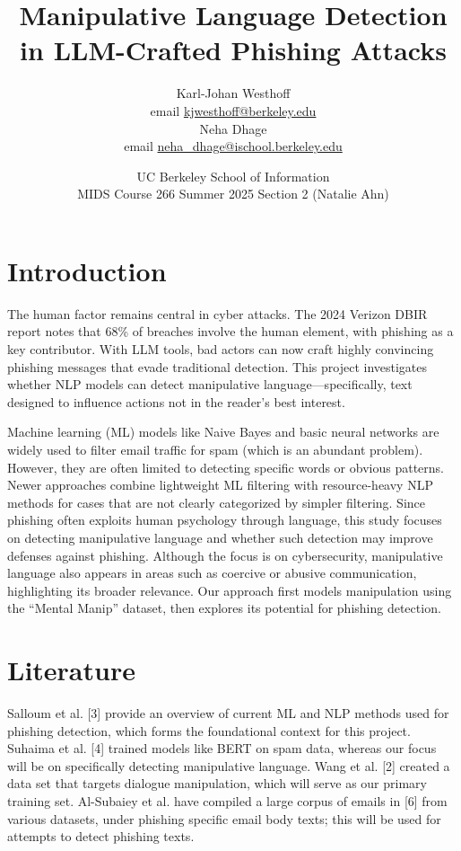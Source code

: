 \documentclass[
	letterpaper, %
	12pt, %
	unnumberedsections, %
	twoside, %
]{LTJournalArticle}
\title{Manipulative Language Detection in LLM-Crafted
Phishing Attacks
}  %
\author{
	Karl-Johan Westhoff \\
	email \href{mailto:kjwesthoff@berkeley.edu}{kjwesthoff@berkeley.edu} \\
    Neha Dhage \\
	email \href{mailto:neha_dhage@ischool.berkeley.edu}{neha_dhage@ischool.berkeley.edu}
}
\date{UC Berkeley School of Information \\
MIDS Course 266 Summer 2025 Section 2 (Natalie Ahn) \\
}
\begin{document}
\maketitle %
\section{Introduction}
The human factor remains central in cyber attacks. The 2024 Verizon DBIR report  notes that 68\% of breaches involve the human element, with phishing as a key contributor. With LLM tools, bad actors can now craft highly convincing phishing messages that evade traditional detection.
This project investigates whether NLP models can detect manipulative language—specifically, text designed to influence actions not in the reader's best interest.

Machine learning (ML) models like Naive Bayes and basic neural networks are widely used to filter email traffic for spam (which is an abundant problem). However, they are often limited to detecting specific words or obvious patterns. Newer approaches combine lightweight ML filtering with resource-heavy NLP methods for cases that are not clearly categorized by simpler filtering. Since phishing often exploits human psychology through language, this study focuses on detecting manipulative language and whether such detection may improve defenses against phishing. Although the focus is on cybersecurity, manipulative language also appears in areas such as coercive or abusive communication, highlighting its broader relevance. Our approach first models manipulation using the “Mental Manip” dataset, then explores its potential for phishing detection.

\section{Literature}
Salloum et al. [3] provide an overview of current ML and NLP methods used for phishing detection, which forms the foundational context for this project.
Suhaima et al. [4] trained models like BERT on spam data, whereas our focus will be on specifically detecting manipulative language.
Wang et al. [2] created a data set that targets dialogue manipulation, which will serve as our primary training set.
Al-Subaiey et al. have compiled a large corpus of emails in [6] from various datasets, under phishing specific email body texts; this will be used for attempts to detect phishing texts.
\end{document}
